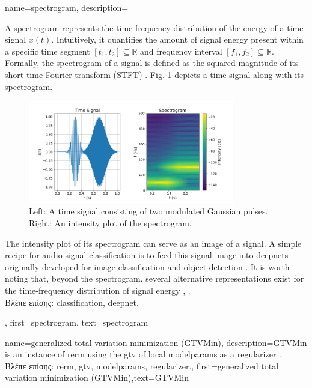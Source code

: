 \newcommand{\gaussiancenter}{3}

{name={spectrogram},
	description={A spectrogram represents the time-frequency distribution of the energy of a time signal $x(t)$.  
		Intuitively, it quantifies the amount of signal energy present within a specific time segment 
		$[t_{1},t_{2}] \subseteq \mathbb{R}$ and frequency interval $[f_{1},f_{2}]\subseteq \mathbb{R}$. 
		Formally, the spectrogram of a signal is defined as the squared magnitude of its 
		short-time Fourier transform (STFT) \cite{cohen1995time}.
        		Fig. \ref{fig:spectrogram_dict} depicts a time signal along with its spectrogram. 
		\begin{figure}[H]
			\centering
			\includegraphics[width=0.8\textwidth]{assets/spectrogram.png}
			\caption{Left: A time signal consisting of two modulated Gaussian pulses. Right: An intensity 
			plot of the spectrogram.
			\label{fig:spectrogram_dict}}
		\end{figure}
        		The intensity plot of its spectrogram can serve as an image of a signal. A 
		simple recipe for audio signal \gls{classification} is to feed this signal image 
		into \gls{deepnet}s originally developed for image \gls{classification} and object detection \cite{Li:2022aa}. 
		It is worth noting that, beyond the spectrogram, several alternative representations exist 
		for the time-frequency distribution of signal energy \cite{TimeFrequencyAnalysisBoashash}, \cite{MallatBook}.\\
		\foreignlanguage{greek}{Βλέπε επίσης:} \gls{classification}, \gls{deepnet}.
		}, 
	first={spectrogram},
	text={spectrogram}
}

{name={generalized total variation minimization (GTVMin)},
	description={GTVMin is an instance of \gls{rerm} 
		using the \gls{gtv} of local \gls{modelparams} as a \gls{regularizer} \cite{ClusteredFLTVMinTSP}.\\
		\foreignlanguage{greek}{Βλέπε επίσης:} \gls{rerm}, \gls{gtv}, \gls{modelparams}, \gls{regularizer}.},
	first={generalized total variation minimization (GTVMin)},text={GTVMin} 
}

